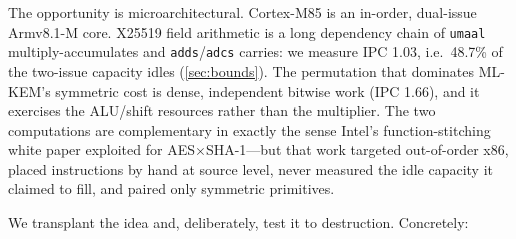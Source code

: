 \documentclass[11pt,a4paper]{article}
\begin{document}
The opportunity is microarchitectural. Cortex-M85 is an in-order, dual-issue
Armv8.1-M core. X25519 field arithmetic is a long dependency chain of
\texttt{umaal} multiply-accumulates and \texttt{adds}/\texttt{adcs} carries: we
measure IPC 1.03, i.e.\ 48.7\% of the two-issue capacity idles
(\cref{sec:bounds}). The \keccak{} permutation that dominates ML-KEM's symmetric
cost is dense, independent bitwise work (IPC 1.66), and it exercises the
ALU/shift resources rather than the multiplier. The two computations are
complementary in exactly the sense Intel's function-stitching white paper
\cite{Intel10} exploited for AES$\times$SHA-1---but that work targeted
out-of-order x86, placed instructions by hand at source level, never measured the
idle capacity it claimed to fill, and paired only symmetric primitives.

We transplant the idea and, deliberately, test it to destruction. Concretely:
\end{document}
